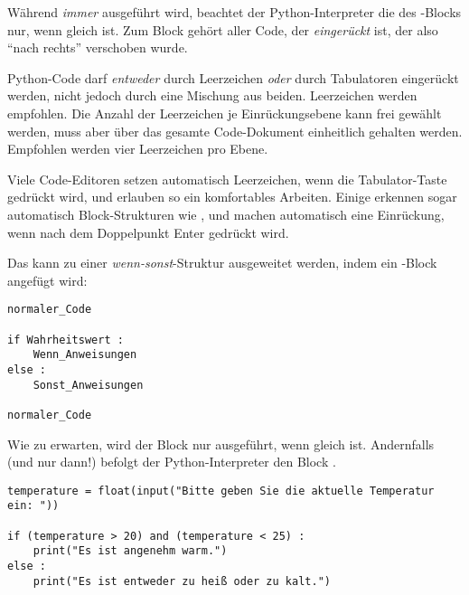 Während  \emph{immer} ausgeführt wird, beachtet der Python-Interpreter die  des -Blocks nur, wenn  gleich  ist. Zum Block  gehört aller Code, der \emph{eingerückt} ist, der also \enquote{nach rechts} verschoben wurde.

\begin{hintbox}
Python-Code darf \emph{entweder} durch Leerzeichen \emph{oder} durch Tabulatoren eingerückt werden, nicht jedoch durch eine Mischung aus beiden. Leerzeichen werden empfohlen. Die Anzahl der Leerzeichen je Einrückungsebene kann frei gewählt werden, muss aber über das gesamte Code-Dokument einheitlich gehalten werden. Empfohlen werden vier Leerzeichen pro Ebene.

Viele Code-Editoren setzen automatisch Leerzeichen, wenn die Tabulator-Taste gedrückt wird, und erlauben so ein komfortables Arbeiten. Einige erkennen sogar automatisch Block-Strukturen wie , und machen automatisch eine Einrückung, wenn nach dem Doppelpunkt Enter gedrückt wird.
\end{hintbox}

Das  kann zu einer \emph{wenn-sonst}-Struktur ausgeweitet werden, indem ein -Block angefügt wird:
\begin{codebox}
\begin{verbatim}
normaler_Code

if Wahrheitswert :
    Wenn_Anweisungen
else :
    Sonst_Anweisungen
	
normaler_Code
\end{verbatim}
\end{codebox}

Wie zu erwarten, wird der Block  nur ausgeführt, wenn  gleich  ist. Andernfalls (und nur dann!) befolgt der Python-Interpreter den Block .

\begin{codebox}
\begin{verbatim}
temperature = float(input("Bitte geben Sie die aktuelle Temperatur ein: "))

if (temperature > 20) and (temperature < 25) :
    print("Es ist angenehm warm.")
else :
    print("Es ist entweder zu heiß oder zu kalt.")
\end{verbatim}
\end{codebox}

